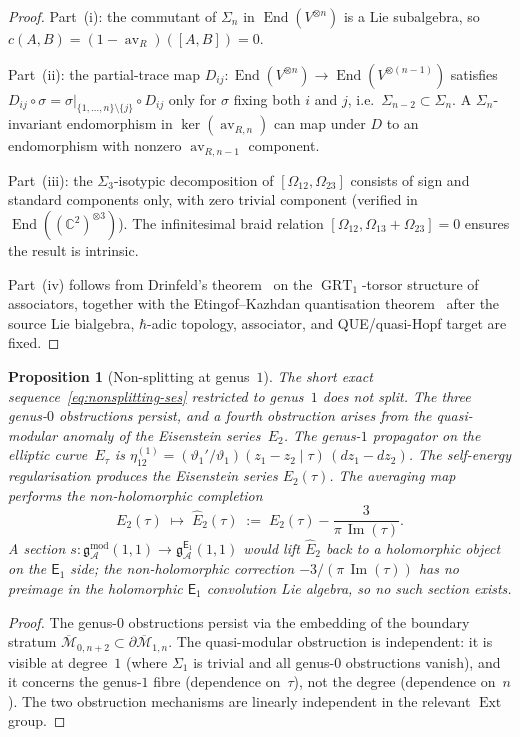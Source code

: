 \documentclass[11pt,reqno]{amsart}
\newtheorem{proposition}[theorem]{Proposition}
\theoremstyle{definition}
\theoremstyle{remark}
\newcommand{\cA}{\mathcal{A}}
\newcommand{\cM}{\mathcal{M}}
\newcommand{\Eone}{\mathsf{E}_{1}}
\DeclareMathOperator{\End}{End}
\DeclareMathOperator{\av}{av}
\DeclareMathOperator{\GRT}{GRT}
\newcommand{\gmod}{\mathfrak{g}^{\mathrm{mod}}_{\cA}}
\newcommand{\gEone}{\mathfrak{g}^{\Eone}_{\cA}}
\newcommand{\CC}{\mathbb{C}}
\numberwithin{equation}{section}
\begin{document}
\begin{proof}
Part~(i): the commutant of $\Sigma_n$ in $\End(V^{\otimes n})$ is
a Lie subalgebra, so $c(A,B) = (1 - \av_R)([A,B]) = 0$.

Part~(ii): the partial-trace map
$D_{ij}\colon \End(V^{\otimes n}) \to \End(V^{\otimes(n-1)})$
satisfies
$D_{ij} \circ \sigma = \sigma|_{\{1,\ldots,n\}\setminus\{j\}}
\circ D_{ij}$
only for $\sigma$ fixing both $i$ and $j$, i.e.\
$\Sigma_{n-2} \subset \Sigma_n$. A $\Sigma_n$-invariant
endomorphism in $\ker(\av_{R,n})$ can map under $D$ to an
endomorphism with nonzero $\av_{R,n-1}$ component.

Part~(iii): the $\Sigma_3$-isotypic decomposition of
$[\Omega_{12}, \Omega_{23}]$ consists of sign and standard
components only, with zero trivial component (verified in
$\End((\CC^2)^{\otimes 3})$). The infinitesimal braid relation
$[\Omega_{12}, \Omega_{13} + \Omega_{23}] = 0$ ensures the result
is intrinsic.

Part~(iv) follows from Drinfeld's theorem~\cite{Drinfeld91} on the
$\GRT_1$-torsor structure of associators, together with the
Etingof--Kazhdan quantisation theorem~\cite{EK96} after the source
Lie bialgebra, \(\hbar\)-adic topology, associator, and
QUE/quasi-Hopf target are fixed.
\end{proof}

\begin{proposition}[Non-splitting at genus~$1$]
\label{prop:nonsplitting-genus1}
The short exact sequence~\eqref{eq:nonsplitting-ses}
restricted to genus~$1$ does not split. The three genus-$0$
obstructions persist, and a fourth obstruction arises from the
quasi-modular anomaly of the Eisenstein series~$E_2$. The
genus-$1$ propagator on the elliptic curve~$E_\tau$ is
$\eta_{12}^{(1)} = (\vartheta_1'/\vartheta_1)(z_1 - z_2 \mid
\tau)\,(dz_1 - dz_2)$. The self-energy regularisation produces the
Eisenstein series $E_2(\tau)$. The averaging map performs the
non-holomorphic completion
\[
  E_2(\tau)
  \;\longmapsto\;
  \widehat{E}_2(\tau)
  \;:=\;
  E_2(\tau) - \frac{3}{\pi\,\operatorname{Im}(\tau)}.
\]
A section $s\colon \gmod(1,1) \to \gEone(1,1)$ would lift
$\widehat{E}_2$ back to a holomorphic object on the $\Eone$ side;
the non-holomorphic correction $-3/(\pi\,\operatorname{Im}(\tau))$
has no preimage in the holomorphic $\Eone$ convolution Lie algebra,
so no such section exists.
\end{proposition}

\begin{proof}
The genus-$0$ obstructions persist via the embedding of the boundary
stratum $\overline{\cM}_{0,n+2} \subset \partial\overline{\cM}_{1,n}$.
The quasi-modular obstruction is independent: it is visible at
degree~$1$ (where $\Sigma_1$ is trivial and all genus-$0$
obstructions vanish), and it concerns the genus-$1$ fibre
(dependence on~$\tau$), not the degree (dependence on~$n$). The
two obstruction mechanisms are linearly independent in the relevant
$\operatorname{Ext}$ group.
\end{proof}
\end{document}
